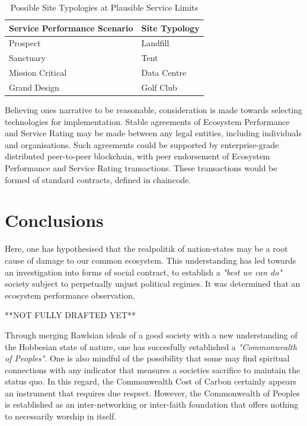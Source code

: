 \documentclass[11pt, oneside]{article}   	%
\begin{document}
\begin{table}[H]
\caption{Possible Site Typologies at Plausible Service Limits}
\begin{center}
\begin{tabular}{| l | l |}
\hline
Service Performance Scenario&Site Typology\\
\hline
Prospect&Landfill\\
Sanctuary&Tent\\
Mission Critical&Data Centre\\
Grand Design&Golf Club\\
\hline
\end{tabular}
\end{center}
\label{Service limits table}
\end{table}

Believing ones narrative to be reasonable, consideration is made towards selecting technologies for implementation.
Stable agreements of Ecosystem Performance and Service Rating may be made between any legal entities, including individuals and organisations.
Such agreements could be supported by enterprise-grade distributed peer-to-peer blockchain, with peer endorsement of Ecosystem Performance and Service Rating transactions.
These transactions would be formed of standard contracts, defined in chaincode.\\

\section{Conclusions}

Here, one has hypothesised that the realpolitik of nation-states may be a root cause of damage to our common ecosystem.
This understanding has led towards an investigation into forms of social contract, to establish a \emph{"best we can do"} society subject to perpetually unjust political regimes.
It was determined that an ecosystem performance observation, 

**NOT FULLY DRAFTED YET**

Through merging Rawlsian ideals of a good society with a new understanding of the Hobbesian state of nature, one has succesfully established a \emph{"Commonwealth of Peoples"}.
One is also mindful of the possibility that some may find spiritual connections with any indicator that measures a societies sacrifice to maintain the status quo.
In this regard, the Commonwealth Cost of Carbon certainly appears an instrument that requires due respect.
However, the Commonwealth of Peoples is established as an inter-networking or inter-faith foundation that offers nothing to necessarily worship in itself.\\
\end{document}
